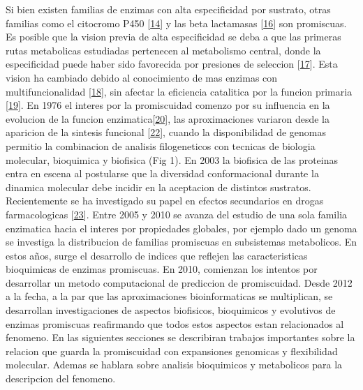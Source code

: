 \documentclass[12pt,twoside]{reedthesis}
\begin{document}
  Si bien existen familias de enzimas con alta especificidad por sustrato,
  otras familias como el citocromo P450
  {[}\protect\hyperlink{ref-bloomux5fneutralux5f2007}{14}{]} y las beta
  lactamasas {[}\protect\hyperlink{ref-zouux5fevolutionux5f2015}{16}{]}
  son promiscuas. Es posible que la vision previa de alta especificidad se
  deba a que las primeras rutas metabolicas estudiadas pertenecen al
  metabolismo central, donde la especificidad puede haber sido favorecida
  por presiones de seleccion
  {[}\protect\hyperlink{ref-firnux5fdarwinianux5f2009}{17}{]}. Esta vision
  ha cambiado debido al conocimiento de mas enzimas con multifuncionalidad
  {[}\protect\hyperlink{ref-jiaux5fmultifunctionalux5f2013}{18}{]}, sin
  afectar la eficiencia catalitica por la funcion primaria
  {[}\protect\hyperlink{ref-aharoniux5fevolvabilityux5f2005}{19}{]}. En
  1976 el interes por la promiscuidad comenzo por su influencia en la
  evolucion de la funcion
  enzimatica{[}\protect\hyperlink{ref-jensenux5fenzymeux5f1976}{20}{]},
  las aproximaciones variaron desde la aparicion de la sintesis funcional
  {[}\protect\hyperlink{ref-deanux5fmechanisticux5f2007}{22}{]}, cuando la
  disponibilidad de genomas permitio la combinacion de analisis
  filogeneticos con tecnicas de biologia molecular, bioquimica y biofisica
  (Fig 1). En 2003 la biofisica de las proteinas entra en escena al
  postularse que la diversidad conformacional durante la dinamica
  molecular debe incidir en la aceptacion de distintos sustratos.
  Recientemente se ha investigado su papel en efectos secundarios en
  drogas farmacologicas
  {[}\protect\hyperlink{ref-nobeliux5fproteinux5f2009}{23}{]}. Entre 2005
  y 2010 se avanza del estudio de una sola familia enzimatica hacia el
  interes por propiedades globales, por ejemplo dado un genoma se
  investiga la distribucion de familias promiscuas en subsistemas
  metabolicos. En estos años, surge el desarrollo de indices que reflejen
  las caracteristicas bioquimicas de enzimas promiscuas. En 2010,
  comienzan los intentos por desarrollar un metodo computacional de
  prediccion de promiscuidad. Desde 2012 a la fecha, a la par que las
  aproximaciones bioinformaticas se multiplican, se desarrollan
  investigaciones de aspectos biofisicos, bioquimicos y evolutivos de
  enzimas promiscuas reafirmando que todos estos aspectos estan
  relacionados al fenomeno. En las siguientes secciones se describiran
  trabajos importantes sobre la relacion que guarda la promiscuidad con
  expansiones genomicas y flexibilidad molecular. Ademas se hablara sobre
  analisis bioquimicos y metabolicos para la descripcion del fenomeno.
  
\end{document}
